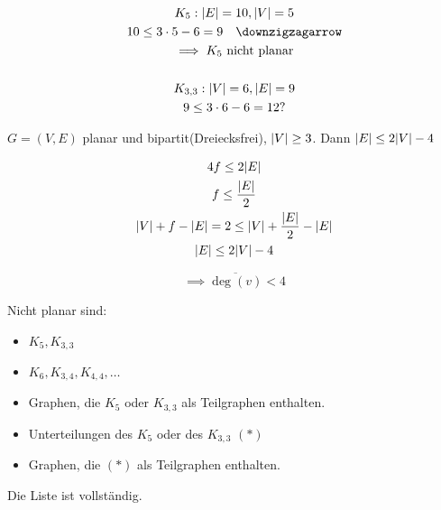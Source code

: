 \begin{gather*}
	K_5: \abs{E} = 10 , \abs{V} = 5 \\
	10 \leq 3 \cdot 5 - 6 = 9 \quad \lightning \\
	\implies K_5 \text{ nicht planar}\\
	\\
	K_{3,3}: \abs{V} = 6 , \abs{E} = 9 \\
	9 \leq 3 \cdot 6 - 6 = 12 ?
\end{gather*}
\begin{korr*}
	$G=(V,E)$ planar und bipartit(Dreiecksfrei), $\abs{V} \geq 3$. Dann $\abs{E} \leq 2 \abs{V} - 4$\\
	\begin{bew}
		\begin{gather*}
				4f \leq 2 \abs{E} \\
				f \leq \frac{\abs{E}}{2} \\
				\abs{V} + f - \abs{E} = 2 \leq \abs{V} + \frac{\abs{E}}{2} - \abs{E} \\
				\abs{E} \leq 2 \abs{V} - 4
		\end{gather*}
	\end{bew}
	\[ \implies \overline{\deg(v)} < 4 \]
\end{korr*}

Nicht planar sind:
\begin{itemize}
	\item $K_5 , K_{3,3}$
	\item $K_6 , K_{3,4} , K_{4,4} , \dotsc$
	\item Graphen, die $K_5$ oder $K_{3,3}$ als Teilgraphen enthalten.
	\item Unterteilungen des $K_5$ oder des $K_{3,3}$ $(*)$
	\item Graphen, die $(*)$ als Teilgraphen enthalten.
\end{itemize}
\begin{satz*}[note = (Kuratowski)]
	Die Liste ist vollständig.
\end{satz*}


